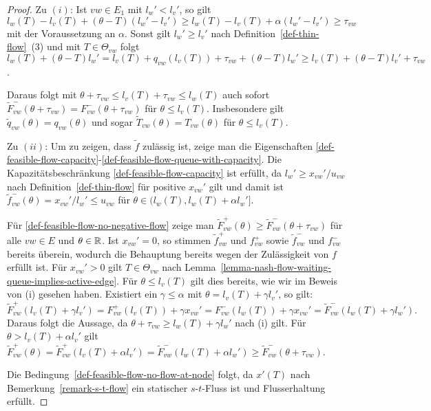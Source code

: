 \begin{proof}
	Zu $(i)$: Ist $vw\in E_1$ mit $l_w'<l_v'$, so gilt
	$l_w(T)-l_v(T) + (\theta - T)(l_w' - l_v') \geq l_w(T)-l_v(T)+\alpha(l_w'- l_v')\geq \tau_{vw}$  mit der Voraussetzung an $\alpha$.
	Sonst gilt $l_w' \geq l_v'$ nach Definition~\ref{def-thin-flow}~(3) und mit $T\in \Theta_{vw}$ folgt $l_w(T)+(\theta-T)l_w'=l_v(T) + q_{vw}(l_v(T))+\tau_{vw}+(\theta - T)l_w' \geq l_v(T) + (\theta-T)l_v'+\tau_{vw}$.
	
	Daraus folgt mit $\theta + \tau_{vw} \leq l_v(T) + \tau_{vw} \leq l_w(T)$ auch sofort $\tilde{F}_{vw}^-(\theta + \tau_{vw}) = F_{vw}^-(\theta + \tau_{vw})$ für $\theta\leq l_v(T)$.
	Insbesondere gilt $\tilde{q}_{vw}(\theta) = q_{vw}(\theta)$ und sogar $ \tilde{T}_{vw}(\theta)= T_{vw}(\theta)$ für $\theta \leq l_v(T)$.
	
	Zu $(ii)$: Um zu zeigen, dass $\tilde{f}$ zulässig ist, zeige man die Eigenschaften \ref{def-feasible-flow-capacity}-\ref{def-feasible-flow-queue-with-capacity}.
	Die Kapazitätsbeschränkung \ref{def-feasible-flow-capacity} ist erfüllt, da $l_w'\geq x_{vw}' / u_{vw}$ nach Definition~\ref{def-thin-flow} für positive $x_{vw}'$ gilt und damit ist $\tilde{f}^-_{vw}(\theta)=x_{vw}'/l_w'\leq u_{vw}$ für $\theta\in(l_w(T), l_w(T)+\alpha l_w']$.
	
	Für \ref{def-feasible-flow-no-negative-flow} zeige man $\tilde{F}^+_{vw}(\theta)\geq \tilde{F}_{vw}^-(\theta+\tau_{vw})$ für alle $vw\in E$ und $\theta\in\mathbb{R}$.
	Ist $x_{vw}'=0$, so stimmen $\tilde{f}_{vw}^+$ und  $f_{vw}^+$ sowie $\tilde{f}_{vw}^-$ und $f_{vw}^-$ bereits überein, wodurch die Behauptung bereits wegen der Zulässigkeit von $f$ erfüllt ist.
	Für $x_{vw}'>0$ gilt $T\in\Theta_{vw}$ nach Lemma~\ref{lemma-nash-flow-waiting-queue-implies-active-edge}.
	Für $\theta\leq l_v(T)$ gilt dies bereits, wie wir im Beweis von (i) gesehen haben.
	Existiert ein $\gamma\leq\alpha$ mit $\theta=l_v(T) + \gamma l_v'$, so gilt:
	\begin{equation}\label{eq-extension-nash-flow}
	\tilde{F}_{vw}^+(l_v(T) + \gamma l_v')=F_{vw}^+(l_v(T))+\gamma x_{vw}' = F_{vw}^-(l_w(T))+ \gamma x_{vw}'= \tilde{F}_{vw}^-(l_w(T)+\gamma l_w').
	\end{equation}
	Daraus folgt die Aussage, da $\theta + \tau_{vw}\geq l_w(T) + \gamma l_w'$ nach (i) gilt.
	Für $\theta > l_v(T)+\alpha l_v'$ gilt $\tilde{F}_{vw}^+(\theta) = \tilde{F}_{vw}^+(l_v(T) + \alpha l_v') = \tilde{F}_{vw}^-(l_w(T) + \alpha l_w') \geq \tilde{F}_{vw}^-(\theta + \tau_{vw})$.
	
	Die Bedingung~\ref{def-feasible-flow-no-flow-at-node} folgt, da $x'(T)$ nach Bemerkung~\ref{remark-s-t-flow} ein statischer $s$-$t$-Fluss ist und Flusserhaltung erfüllt.


\end{proof}
